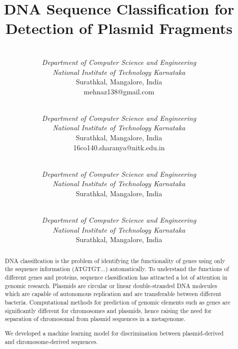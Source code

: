 \documentclass[conference]{IEEEtran}
\begin{document}
\title{DNA Sequence Classification for Detection of Plasmid Fragments}

\author{
 \\
\textit{Department of Computer Science and Engineering} \\
\textit{National Institute of Technology Karnataka}\\
Surathkal, Mangalore, India \\
mehnaz138@gmail.com \\

\and
{} \\
\textit{Department of Computer Science and Engineering} \\
\textit{National Institute of Technology Karnataka}\\
Surathkal, Mangalore, India \\
16co140.sharanya@nitk.edu.in \\

\and
{} \\
\textit{Department of Computer Science and Engineering} \\
\textit{National Institute of Technology Karnataka}\\
Surathkal, Mangalore, India \\

\and
{} \\
\textit{Department of Computer Science and Engineering} \\
\textit{National Institute of Technology Karnataka}\\
Surathkal, Mangalore, India \\

}

\maketitle

\begin{abstract}
DNA classification is the problem of identifying the functionality of genes using only the sequence information (ATGTGT...) automatically. To understand the functions of different genes and proteins, sequence classification has attracted a lot of attention in genomic research. Plasmids are circular or linear double-stranded DNA molecules which are capable of autonomous replication and are transferable between different bacteria. Computational methods for prediction of genomic elements such as genes are significantly different for chromosomes and plasmids, hence raising the need for separation of chromosomal from plasmid sequences in a metagenome.

We developed a machine learning model for discrimination between plasmid-derived and chromosome-derived sequences.
\end{abstract}
\end{document}
